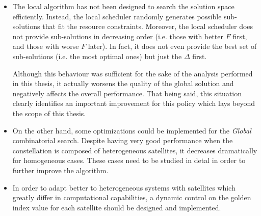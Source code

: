 \begin{itemize}
\item The local algorithm has not been designed to search the solution space efficiently. Instead, the local scheduler randomly generates possible sub-solutions that fit the resource constraints. Moreover, the local scheduler does not provide sub-solutions in decreasing order (i.e. those with better $F$ first, and those with worse $F$ later). In fact, it does not even provide the best set of sub-solutions (i.e. the most optimal ones) but just the $\Delta$ first. 

Although this behaviour was sufficient for the sake of the analysis performed in this thesis, it actually worsens the quality of the global solution and negatively affects the overall performance. That being said, this situation clearly identifies an important improvement for this policy which lays beyond the scope of this thesis.



\item On the other hand, some optimizations could be implemented for the \emph{Global} combinatorial search. Despite having very good performance when the constellation is composed of heterogeneous satellites, it decreases dramatically for homogeneous cases. These cases need to be studied in detal in order to further improve the algorithm.

\item In order to adapt better to heterogeneous systems with satellites which greatly differ in computational capabilities, a dynamic control on the golden index value for each satellite should be designed and implemented.


\end{itemize}
